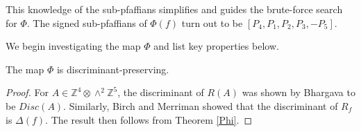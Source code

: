 \documentclass{report}
\begin{document}
This knowledge of the sub-pfaffians simplifies and guides the brute-force search for $\Phi$.  The signed sub-pfaffians of $\Phi(f)$ turn out to be $[ P_4, P_1, P_2, P_3, - P_5 ]$.

We begin investigating the map $\Phi$ and list key properties below.

\begin{corollary} \label{disc}
The map $\Phi$ is discriminant-preserving.
\end{corollary}
\begin{proof}
For $A \in \mathbb{Z}^4 \otimes \wedge^2 \mathbb{Z}^5$, the discriminant of $R(A)$ was shown by Bhargava to be $Disc(A)$.  Similarly, Birch and Merriman showed that the discriminant of $R_f$ is $\Delta(f)$.  The result then follows from Theorem \ref{Phi}.
\end{proof}
\end{document}
